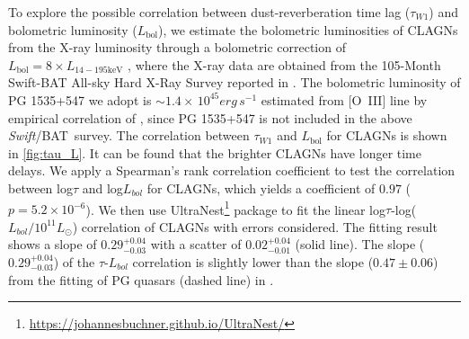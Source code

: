 \documentclass[linenumbers]{aastex631}
\newcommand{\bat}{{\small {\it Swift}/BAT}}
\begin{document}
To explore the possible correlation between dust-reverberation time lag ($\tau_{W1}$) and bolometric luminosity ($L_\mathrm{bol}$), we estimate the bolometric luminosities of CLAGNs from the X-ray luminosity through a bolometric correction of $L_{\mathrm{bol}}=8 \times L_{\mathrm{14-195 keV }}$ \citep[e.g.,][]{2009MNRAS.392.1124V}, where the X-ray data are obtained from the 105-Month Swift-BAT All-sky Hard X-Ray Survey reported in \citet{2018ApJS..235....4O}. {\color{red}The bolometric luminosity of PG 1535+547 we adopt is $\sim 1.4\times \, 10^{45} erg\, s^{-1}$ estimated from [O~{\small III}] line by empirical correlation of \citet{2006ApJ...653..137Z}, since PG 1535+547 is not included in the above \bat\, survey}. The correlation between $\tau_{W1}$ and $L_\mathrm{bol}$ for CLAGNs is shown in \autoref{fig:tau_L}. It can be found that the brighter CLAGNs have longer time delays. We apply a Spearman's rank correlation coefficient to test the correlation between log$\tau$ and log$L_{bol}$ for CLAGNs, which yields a coefficient of $0.97$ ($p=5.2\times10^{-6}$). We then use UltraNest\footnote{\url{https://johannesbuchner.github.io/UltraNest/}} package \citep{2021JOSS....6.3001B} to fit the linear log$\tau$-log($L_{bol}/10^{11} L_{\odot}$) correlation of CLAGNs with errors considered. The fitting result shows a slope of $0.29^{+0.04}_{-0.03}$ with a scatter of $0.02^{+0.04}_{-0.01}$ (solid line). The slope ($0.29^{+0.04}_{-0.03}$) of the $\tau$-$L_{bol}$ correlation is slightly lower than the slope ($0.47 \pm 0.06$) from the fitting of PG quasars (dashed line) in \citet[][]{2019ApJ...886...33L}.






%
\end{document}
